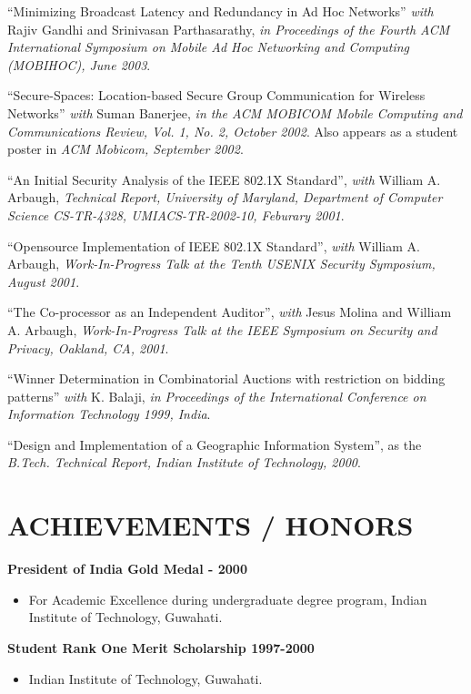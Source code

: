 \begin{resume}
``Minimizing Broadcast Latency and Redundancy in Ad Hoc Networks'' {\em with} 
Rajiv Gandhi and Srinivasan Parthasarathy, {\em in Proceedings of the Fourth ACM International Symposium on
Mobile Ad Hoc Networking and Computing (MOBIHOC), June 2003}.

``Secure-Spaces: Location-based Secure Group Communication for Wireless Networks'' {\em with}
Suman Banerjee, {\em in the ACM MOBICOM Mobile Computing and Communications Review, Vol. 1, No. 2, October 2002}.
Also appears as a student poster in {\em ACM Mobicom, September 2002}.


``An Initial Security Analysis of the IEEE 802.1X Standard'', {\em with} William A. Arbaugh,
{\em Technical Report, University of Maryland, Department of Computer Science CS-TR-4328, 
UMIACS-TR-2002-10, Feburary 2001}.


``Opensource Implementation of IEEE 802.1X Standard'', {\em with} William A. Arbaugh,
{\em Work-In-Progress Talk at the Tenth USENIX Security Symposium, August 2001}.

``The Co-processor as an Independent Auditor'', {\em with} Jesus Molina and William A. Arbaugh,
{\em Work-In-Progress Talk at the IEEE Symposium on Security and Privacy, Oakland, CA, 2001}.

``Winner Determination in Combinatorial Auctions with restriction on bidding patterns'' {\em with}
K. Balaji, {\em in Proceedings of the International Conference on Information Technology 1999, India}.

``Design and Implementation of a Geographic Information System'', as the {\em B.Tech. Technical Report,
 Indian Institute of Technology, 2000}.


\section{ACHIEVEMENTS / HONORS}
\vspace{0.1in}

{\bf President of India Gold Medal - 2000}
    \begin{itemize}
         \item[] For Academic Excellence during undergraduate degree program, Indian Institute of Technology, Guwahati.
    \end{itemize}


{\bf Student Rank One Merit Scholarship 1997-2000}
    \begin{itemize}
         \item[] Indian Institute of Technology, Guwahati.
    \end{itemize}


\end{resume}
